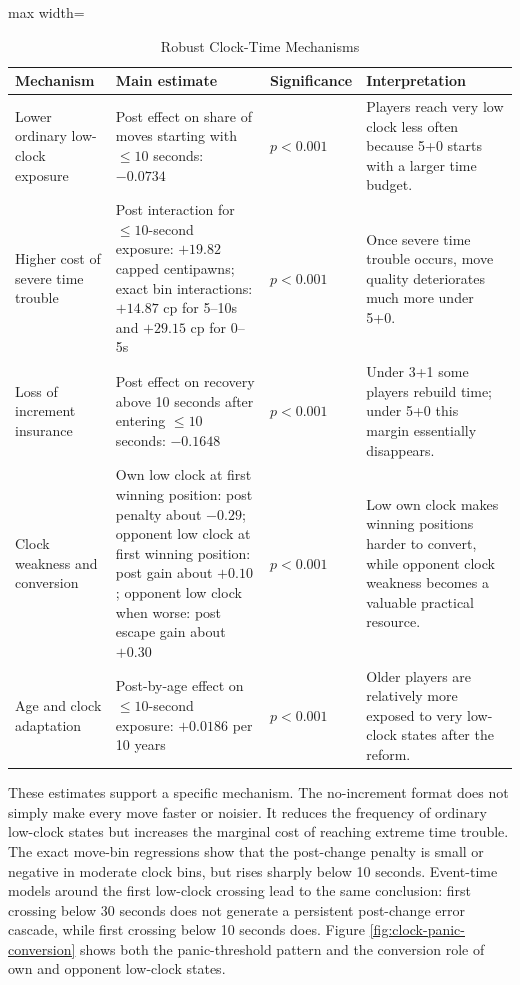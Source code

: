 \begin{table}[H]
\centering
\caption{Robust Clock-Time Mechanisms}
\label{tab:clock-mechanisms}
\small
\begin{adjustbox}{max width=\textwidth}
\begin{tabular}{p{}p{}p{}p{}}
\toprule
Mechanism & Main estimate & Significance & Interpretation \\
\midrule
Lower ordinary low-clock exposure & Post effect on share of moves starting with \(\leq 10\) seconds: \(-0.0734\) & \(p<0.001\) & Players reach very low clock less often because 5+0 starts with a larger time budget. \\
Higher cost of severe time trouble & Post interaction for \(\leq 10\)-second exposure: \(+19.82\) capped centipawns; exact bin interactions: \(+14.87\) cp for 5--10s and \(+29.15\) cp for 0--5s & \(p<0.001\) & Once severe time trouble occurs, move quality deteriorates much more under 5+0. \\
Loss of increment insurance & Post effect on recovery above 10 seconds after entering \(\leq 10\) seconds: \(-0.1648\) & \(p<0.001\) & Under 3+1 some players rebuild time; under 5+0 this margin essentially disappears. \\
Clock weakness and conversion & Own low clock at first winning position: post penalty about \(-0.29\); opponent low clock at first winning position: post gain about \(+0.10\); opponent low clock when worse: post escape gain about \(+0.30\) & \(p<0.001\) & Low own clock makes winning positions harder to convert, while opponent clock weakness becomes a valuable practical resource. \\
Age and clock adaptation & Post-by-age effect on \(\leq 10\)-second exposure: \(+0.0186\) per 10 years & \(p<0.001\) & Older players are relatively more exposed to very low-clock states after the reform. \\
\bottomrule
\end{tabular}
\end{adjustbox}
\end{table}

These estimates support a specific mechanism. The no-increment format does not simply make every move faster or noisier. It reduces the frequency of ordinary low-clock states but increases the marginal cost of reaching extreme time trouble. The exact move-bin regressions show that the post-change penalty is small or negative in moderate clock bins, but rises sharply below 10 seconds. Event-time models around the first low-clock crossing lead to the same conclusion: first crossing below 30 seconds does not generate a persistent post-change error cascade, while first crossing below 10 seconds does. Figure \ref{fig:clock-panic-conversion} shows both the panic-threshold pattern and the conversion role of own and opponent low-clock states.

